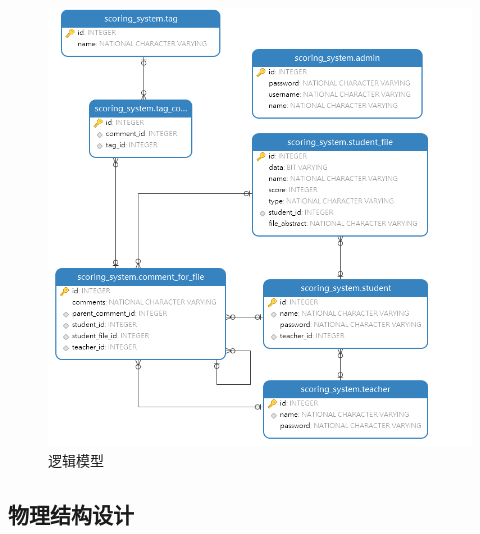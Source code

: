 \begin{figure}[H]
    \centering
    \includegraphics[scale = 0.6]{out/uml/数据库/logical-model.png}
    \caption{\song\wuhao 逻辑模型}
    \label{logical-model}
\end{figure}

\subsection{物理结构设计}

